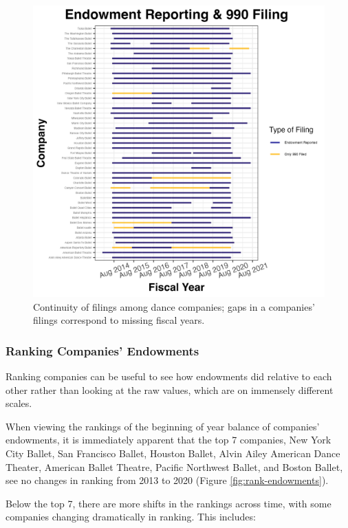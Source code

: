 \documentclass[Dance Data
Project,article,submit,moreauthors,pdftex]{mdpi}
\begin{document}
\begin{figure}[H]
\includegraphics[width=0.9\linewidth,]{../images/gap_plot_endowment} \caption{\label{fig:gap-plot}Continuity of filings among dance companies; gaps in a companies' filings correspond to missing fiscal years.}\label{fig:unnamed-chunk-3}
\end{figure}

\hypertarget{ranking-companies-endowments}{%
\subsubsection{Ranking Companies'
Endowments}\label{ranking-companies-endowments}}

Ranking companies can be useful to see how endowments did relative to
each other rather than looking at the raw values, which are on immensely
different scales.

When viewing the rankings of the beginning of year balance of companies'
endowments, it is immediately apparent that the top 7 companies, New
York City Ballet, San Francisco Ballet, Houston Ballet, Alvin Ailey
American Dance Theater, American Ballet Theatre, Pacific Northwest
Ballet, and Boston Ballet, see no changes in ranking from 2013 to 2020
(Figure \ref{fig:rank-endowments}).

Below the top 7, there are more shifts in the rankings across time, with
some companies changing dramatically in ranking. This includes:
\end{document}
